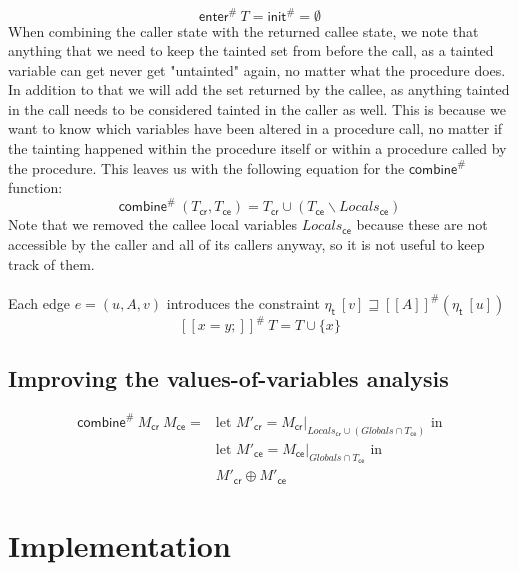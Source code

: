       \[\textsf{enter}^{\#}\ T = \textsf{init}^{\#} = \emptyset\]
      When combining the caller state with the returned callee state, we note that anything that we need to keep the tainted set from before the call, as a tainted variable can get never get "untainted" again, no matter what the procedure does. In addition to that we will add the set returned by the callee, as anything tainted in the call needs to be considered tainted in the caller as well. This is because we want to know which variables have been altered in a procedure call, no matter if the tainting happened within the procedure itself or within a procedure called by the procedure. This leaves us with the following equation for the $\textsf{combine}^{\#}$ function:
      \[ \textsf{combine}^{\#}\ (T_\textsf{cr}, T_\textsf{ce}) = T_\textsf{cr} \cup (T_\textsf{ce} \backslash Locals_\textsf{ce}) \]
      Note that we removed the callee local variables $Locals_\textsf{ce}$ because these are not accessible by the caller and all of its callers anyway, so it is not useful to keep track of them.
      \\
      \\
      Each edge $e = (u, A, v)$ introduces the constraint $\eta_\textsf{t}\ [v] \sqsupseteq [\![  A ]\!]^{\#}  (\eta_\textsf{t}\ [u]) $\\
      \[ [\![ x = y; ]\!] ^{\#}\ T =  T \cup \{x\} \]


    \subsection{Improving the values-of-variables analysis}
      \begin{align*}
        \textsf{combine}^{\#}\ M_\textsf{cr}\ M_\textsf{ce} = & \text{let } M'_\textsf{cr} = M_\textsf{cr}|_{Locals_\textsf{cr} \cup (Globals \cap T_\textsf{ce})} \text{ in}\\
        & \text{let } M'_\textsf{ce} = M_\textsf{ce}|_{Globals \cap T_\textsf{ce}}\text{ in} \\
        & M'_\textsf{cr} \oplus M'_\textsf{ce}
      \end{align*}

  \section{Implementation}


